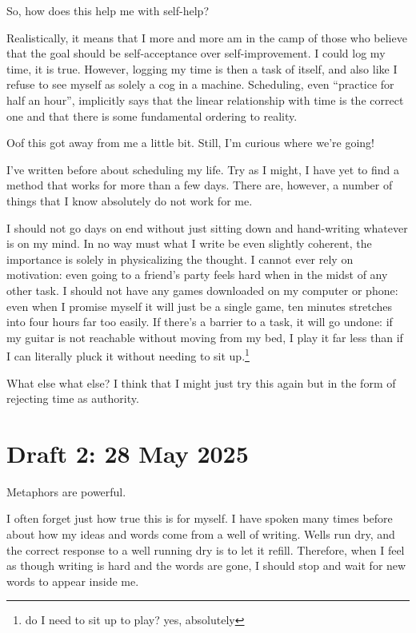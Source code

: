 \documentclass[12pt]{article}
\newcommand{\say}[1]{``#1''}
\renewcommand{\,}{\textsuperscript{,}}
\begin{document}
So, how does this help me with self-help?

Realistically, it means that I more and more am in the camp of those who believe that the goal should be self-acceptance over self-improvement.  
I could log my time, it is true.  
However, logging my time is then a task of itself, and also like I refuse to see myself as solely a cog in a machine.  
Scheduling, even \say{practice for half an hour}, implicitly says that the linear relationship with time is the correct one and that there is some fundamental ordering to reality.

Oof this got away from me a little bit.  
Still, I'm curious where we're going!

I've written before about scheduling my life.  
Try as I might, I have yet to find a method that works for more than a few days.  
There are, however, a number of things that I know absolutely do not work for me.

I should not go days on end without just sitting down and hand-writing whatever is on my mind.  
In no way must what I write be even slightly coherent, the importance is solely in physicalizing the thought.  
I cannot ever rely on motivation: even going to a friend's party feels hard when in the midst of any other task.  
I should not have any games downloaded on my computer or phone: even when I promise myself it will just be a single game, ten minutes stretches into four hours far too easily.  
If there's a barrier to a task, it will go undone: if my guitar is not reachable without moving from my bed, I play it far less than if I can literally pluck it without needing to sit up.\footnote{do I need to sit up to play? yes, absolutely}

What else what else?  
I think that I might just try this again but in the form of rejecting time as authority.

\section{Draft 2: 28 May 2025}

Metaphors are powerful.

I often forget just how true this is for myself.  
I have spoken many times before about how my ideas and words come from a well of writing.  
Wells run dry, and the correct response to a well running dry is to let it refill.  
Therefore, when I feel as though writing is hard and the words are gone, I should stop and wait for new words to appear inside me.
\end{document}
